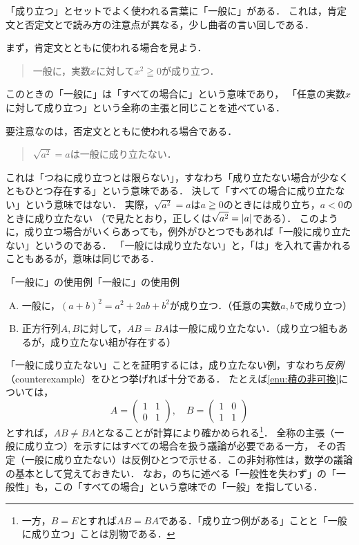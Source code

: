 「成り立つ」とセットでよく使われる言葉に「一般に」がある．
これは，肯定文と否定文とで読み方の注意点が異なる，少し曲者の言い回しである．

まず，肯定文とともに使われる場合を見よう．
\begin{quote}
  一般に，実数$x$に対して$x^2 \geqq 0$が成り立つ．
\end{quote}
このときの「一般に」は「すべての場合に」という意味であり，
「任意の実数$x$に対して成り立つ」という全称の主張と同じことを述べている．

要注意なのは，否定文とともに使われる場合である．
\begin{quote}
  $\sqrt{a^2} = a$は一般に成り立たない．
\end{quote}
これは「つねに成り立つとは限らない」，すなわち「成り立たない場合が少なくともひとつ存在する」という意味である．
決して「すべての場合に成り立たない」という意味ではない．
実際，$\sqrt{a^2}=a$は$a \geqq 0$のときには成り立ち，$a < 0$のときに成り立たない
（で見たとおり，正しくは$\sqrt{a^2}=\lvert a\rvert$である）．
このように，成り立つ場合がいくらあっても，例外がひとつでもあれば「一般に成り立たない」というのである．
「一般には成り立たない」と，「は」を入れて書かれることもあるが，意味は同じである．

\begin{example}{「一般に」の使用例}{「一般に」の使用例}
  \begin{enumerate}[(A)]
    \item 一般に，$(a+b)^2 = a^2 + 2ab + b^2$が成り立つ．（任意の実数$a,b$で成り立つ）
    \item 正方行列$A,B$に対して，$AB=BA$は一般に成り立たない．（成り立つ組もあるが，成り立たない組が存在する）\label{enu:積の非可換}
  \end{enumerate}
\end{example}

「一般に成り立たない」ことを証明するには，成り立たない例，すなわち\emph{反例}（counterexample）をひとつ挙げれば十分である．
たとえば\ref{enu:積の非可換}については，
\[
  A=\begin{pmatrix} 1 & 1 \\ 0 & 1 \end{pmatrix},\quad
  B=\begin{pmatrix} 1 & 0 \\ 1 & 1 \end{pmatrix}
\]
とすれば，$AB \ne BA$となることが計算により確かめられる\footnote{一方，$B=E$とすれば$AB=BA$である．「成り立つ例がある」ことと「一般に成り立つ」ことは別物である．}．
全称の主張（一般に成り立つ）を示すにはすべての場合を扱う議論が必要である一方，
その否定（一般に成り立たない）は反例ひとつで示せる．この非対称性は，数学の議論の基本として覚えておきたい．
なお，のちに述べる「一般性を失わず」の「一般性」も，この「すべての場合」という意味での「一般」を指している．

